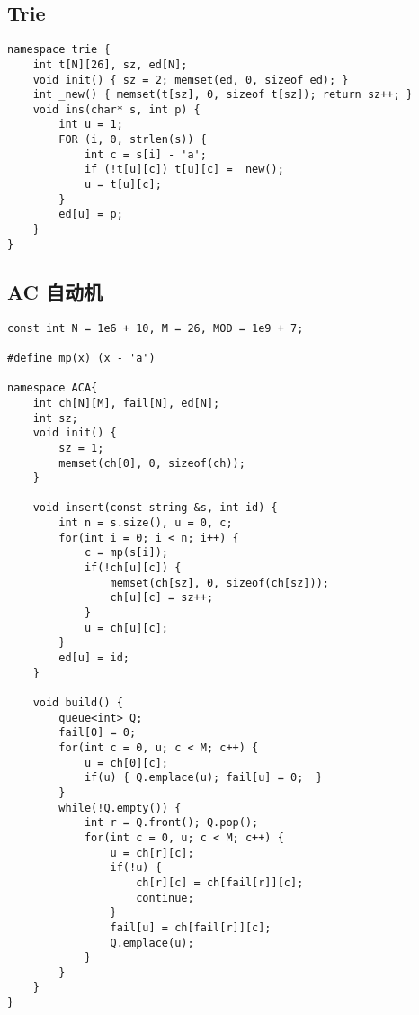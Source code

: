 \documentclass[]{article}
\begin{document}
\hypertarget{trie}{%
\subsection{Trie}\label{trie}}

\begin{verbatim}
namespace trie {
    int t[N][26], sz, ed[N];
    void init() { sz = 2; memset(ed, 0, sizeof ed); }
    int _new() { memset(t[sz], 0, sizeof t[sz]); return sz++; }
    void ins(char* s, int p) {
        int u = 1;
        FOR (i, 0, strlen(s)) {
            int c = s[i] - 'a';
            if (!t[u][c]) t[u][c] = _new();
            u = t[u][c];
        }
        ed[u] = p;
    }
}
\end{verbatim}

\hypertarget{ac-ux81eaux52a8ux673a}{%
\subsection{AC 自动机}\label{ac-ux81eaux52a8ux673a}}

\begin{verbatim}
const int N = 1e6 + 10, M = 26, MOD = 1e9 + 7;

#define mp(x) (x - 'a')

namespace ACA{
    int ch[N][M], fail[N], ed[N];
    int sz;
    void init() {
        sz = 1;
        memset(ch[0], 0, sizeof(ch));
    }
    
    void insert(const string &s, int id) {
        int n = s.size(), u = 0, c;
        for(int i = 0; i < n; i++) {
            c = mp(s[i]);
            if(!ch[u][c]) {
                memset(ch[sz], 0, sizeof(ch[sz]));
                ch[u][c] = sz++;
            }
            u = ch[u][c];
        }
        ed[u] = id;
    }

    void build() {
        queue<int> Q;
        fail[0] = 0;
        for(int c = 0, u; c < M; c++) {
            u = ch[0][c];
            if(u) { Q.emplace(u); fail[u] = 0;  }
        }
        while(!Q.empty()) {
            int r = Q.front(); Q.pop();
            for(int c = 0, u; c < M; c++) {
                u = ch[r][c];
                if(!u) {
                    ch[r][c] = ch[fail[r]][c];
                    continue;
                }
                fail[u] = ch[fail[r]][c];
                Q.emplace(u);
            }
        }
    }
}

\end{verbatim}
\end{document}
